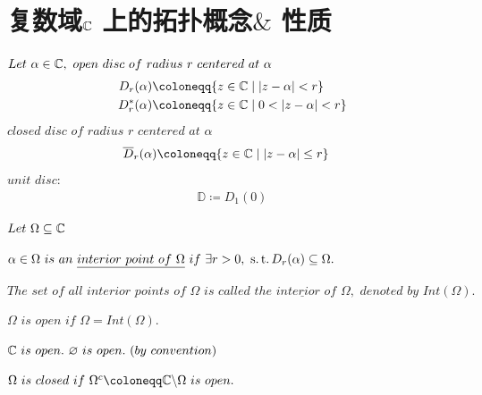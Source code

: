 \newpage
\section{复数域$\mathbb{C}$ 上的拓扑概念$\&$ 性质}
	$Let \,\, \alpha \in \mathbb{C} , \,\, open \,\, disc \,\, of \,\, radius \,\, r \,\, centered \,\, at \,\, \alpha$
	\begin{align}
		D_r (\alpha) &\coloneqq \{ z \in \C \mid \left| z - \alpha \right| < r \} \\
		D_{r}^{*} (\alpha) &\coloneqq \{ z \in \C \mid 0 < \left| z - \alpha \right| < r \}
	\end{align}
	$closed \,\, disc \,\, of \,\, radius \,\, r \,\, centered \,\, at \,\, \alpha$
	\begin{align}
		\overline{D}_r (\alpha) &\coloneqq \{ z \in \C \mid \left| z - \alpha \right| \leq r \}
	\end{align}
	$unit \,\, disc:$
	\begin{align}
		\mathbb{D} \coloneqq D_1 (0)
	\end{align}

\vspace*{2em}
	$Let \,\, \Omega \subseteq \mathbb{C}$
	\begin{defn}
		$\alpha \in \Omega \,\, is \,\, an \,\, \underline{interior \,\, point \,\, of \,\, \Omega} \,\, if \,\, \exists r > 0 , \,\, \operatorname{s.t.} D_{r}(\alpha) \subseteq \Omega.$
		
		\begin{rmk}
			$The \,\, set \,\, of \,\, all \,\, interior \,\, points \,\, of \,\, \Omega \,\, is \,\, called \,\, \underline{the \,\, interior \,\, of \,\, \Omega} , \,\, denoted \,\, by \,\, Int(\Omega).$
		\end{rmk}
	\end{defn}

\vspace*{2em}
	
	\begin{defn}
		$\Omega \,\, is \,\, open \,\, if \,\, \Omega = Int(\Omega).$
		\begin{rmk}
			$\mathbb{C} \,\, is \,\, open . \,\, \varnothing \,\, is \,\, open . \,\,(by \,\, convention)$
		\end{rmk}
	\end{defn}

\vspace*{2em}

	\begin{defn}
		$\Omega \,\, is \,\, closed \,\, if \,\, \Omega^c \coloneqq \C \backslash \Omega \,\, is \,\, open.$
	\end{defn}

